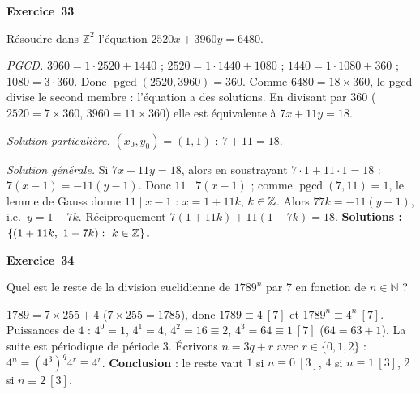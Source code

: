 \documentclass[11pt,a4paper]{article}
\newcommand{\pgcd}{\operatorname{pgcd}}
\begin{document}
	\medskip\noindent\textbf{\Large\color{bleu}Exercice~33}\nopagebreak
	\begin{enonce}
		Résoudre dans $\mathbb{Z}^2$ l’équation $2520x+3960y=6480$.
	\end{enonce}
	\begin{corrige}
		\emph{PGCD.} $3960=1\cdot2520+1440$ ; $2520=1\cdot1440+1080$ ; $1440=1\cdot1080+360$ ; $1080=3\cdot360$. Donc $\pgcd(2520,3960)=360$. Comme $6480=18\times360$, le pgcd divise le second membre : l'équation a des solutions. En divisant par $360$ ($2520=7\times360$, $3960=11\times360$) elle est équivalente à $7x+11y=18$.
		
		\emph{Solution particulière.} $(x_0,y_0)=(1,1)$ : $7+11=18$.
		
		\emph{Solution générale.} Si $7x+11y=18$, alors en soustrayant $7\cdot1+11\cdot1=18$ : $7(x-1)=-11(y-1)$. Donc $11\mid7(x-1)$ ; comme $\pgcd(7,11)=1$, le lemme de Gauss donne $11\mid x-1$ : $x=1+11k$, $k\in\mathbb{Z}$. Alors $77k=-11(y-1)$, i.e.\ $y=1-7k$. Réciproquement $7(1+11k)+11(1-7k)=18$. \textbf{Solutions : $\{(1+11k,\ 1-7k):\ k\in\Z\}$.}
	\end{corrige}
	
	\medskip\noindent\textbf{\Large\color{bleu}Exercice~34}\nopagebreak
	\begin{enonce}
		Quel est le reste de la division euclidienne de $1789^n$ par 7 en fonction de $n \in \mathbb{N}$ ?
	\end{enonce}
	\begin{corrige}
		$1789=7\times255+4$ ($7\times255=1785$), donc $1789\equiv4\ [7]$ et $1789^n\equiv4^n\ [7]$. Puissances de $4$ : $4^0=1$, $4^1=4$, $4^2=16\equiv2$, $4^3=64\equiv1\ [7]$ ($64=63+1$). La suite est périodique de période $3$. Écrivons $n=3q+r$ avec $r\in\{0,1,2\}$ : $4^n=(4^3)^q4^r\equiv4^r$. \textbf{Conclusion} : le reste vaut $1$ si $n\equiv0\ [3]$, $4$ si $n\equiv1\ [3]$, $2$ si $n\equiv2\ [3]$.
	\end{corrige}
	
\end{document}
